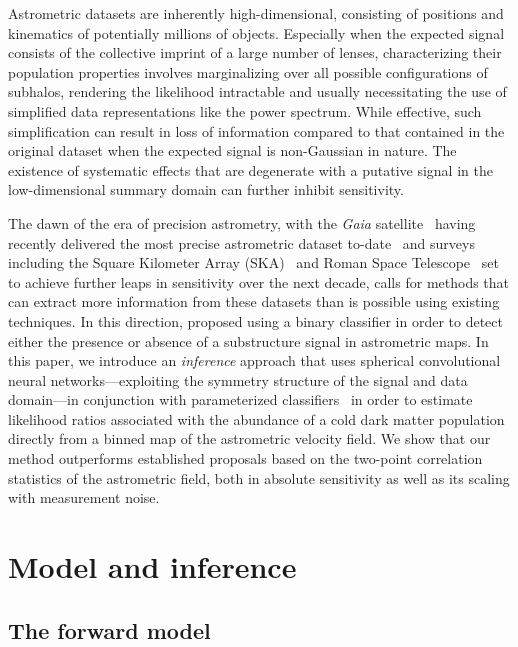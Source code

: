 \documentclass[twocolumn,linenumbers,anonymous]{aastex631}
\begin{document}
Astrometric datasets are inherently high-dimensional, consisting of positions and kinematics of potentially millions of objects. Especially when the expected signal consists of the collective imprint of a large number of lenses, characterizing their population properties involves marginalizing over all possible configurations of subhalos, rendering the likelihood intractable and usually necessitating the use of simplified data representations like the power spectrum. While effective, such simplification can result in loss of information compared to that contained in the original dataset when the expected signal is non-Gaussian in nature. The existence of systematic effects that are degenerate with a putative signal in the low-dimensional summary domain can further inhibit sensitivity. 

The dawn of the era of precision astrometry, with the \emph{Gaia} satellite~\citep{2016A&A...595A...1G} having recently delivered the most precise astrometric dataset to-date~\citep{2018A&A...616A...1G,2018A&A...616A...2L,2021A&A...649A...1G} and surveys including the Square Kilometer Array (SKA)~\citep{Fomalont:2004hr,Jarvis:2015tqa} and Roman Space Telescope~\citep{2019JATIS...5d4005W} set to achieve further leaps in sensitivity over the next decade, calls for methods that can extract more information from these datasets than is possible using existing techniques. In this direction, \citet{Vattis:2020kaa} proposed using a binary classifier in order to detect either the presence or absence of a substructure signal in astrometric maps. In this paper, we introduce an \emph{inference} approach that uses spherical convolutional neural networks---exploiting the symmetry structure of the signal and data domain---in conjunction with parameterized classifiers~\citep{Cranmer:2015bka,Baldi:2016fzo} in order to estimate likelihood ratios associated with the abundance of a cold dark matter population directly from a binned map of the astrometric velocity field. 
We show that our method outperforms established proposals based on the two-point correlation statistics of the astrometric field, both in absolute sensitivity as well as its scaling with measurement noise.

\section{Model and inference}
\label{sec:model}

\subsection{The forward model}
\end{document}
